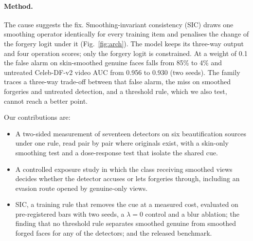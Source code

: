\documentclass[conference]{IEEEtran}
\begin{document}
\paragraph{Method.} The cause suggests the fix. Smoothing-invariant consistency (SIC) draws one smoothing operator
identically for every training item and penalises the change of the forgery logit under it (Fig.~\ref{fig:arch}). The
model keeps its three-way output and four operation scores; only the forgery logit is constrained. At a weight of 0.1 the
false alarm on skin-smoothed genuine faces falls from 85\% to 4\% and untreated Celeb-DF-v2 video AUC from 0.956 to 0.930
(two seeds). The family traces a three-way trade-off between that false alarm, the miss on smoothed forgeries and untreated
detection, and a threshold rule, which we also test, cannot reach a better point.

Our contributions are:
\begin{itemize}
\item A two-sided measurement of seventeen detectors on six beautification sources under one rule, read pair by pair where
originals exist, with a skin-only smoothing test and a dose-response test that isolate the shared cue.
\item A controlled exposure study in which the class receiving smoothed views decides whether the detector accuses or lets
forgeries through, including an evasion route opened by genuine-only views.
\item SIC, a training rule that removes the cue at a measured cost, evaluated on pre-registered bars with two seeds, a
$\lambda=0$ control and a blur ablation; the finding that no threshold rule separates smoothed genuine from smoothed forged
faces for any of the detectors; and the released benchmark.
\end{itemize}

\end{document}
